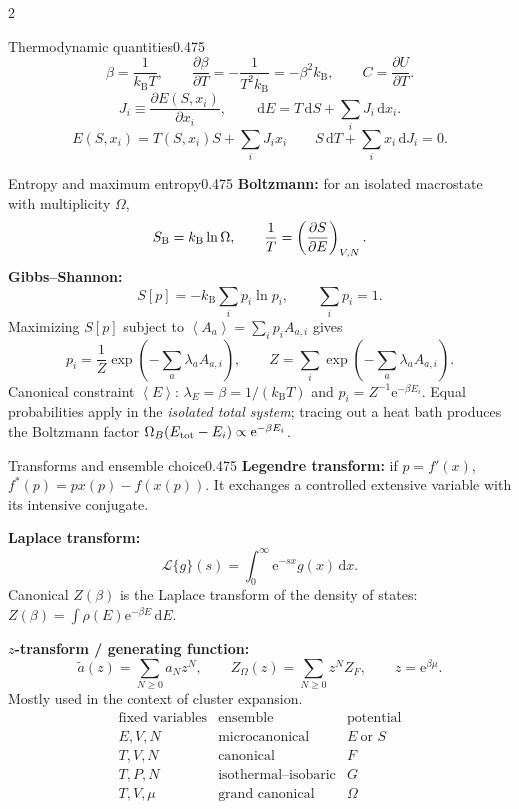 \documentclass[8pt,a4paper]{extarticle}
\newcommand{\dd}{\,\mathrm d}
\newcommand{\avg}[1]{\left\langle #1\right\rangle}
\newcommand{\e}{\mathrm e}
\newcommand{\kb}{k_{\mathrm B}}
\begin{document}
\begin{multicols*}{2}
\begin{mytikzbox}{Thermodynamic quantities}{0.475}
\[
\beta=\frac1{\kb T},\qquad
\frac{\partial\beta}{\partial T}=-\frac1{T^2\kb}=-\beta^2\kb,\qquad
C=\frac{\partial U}{\partial T}.
\]
\[
J_i\equiv\frac{\partial E(S,x_i)}{\partial x_i},\qquad
\dd E=T\dd S+\sum_i J_i\dd x_i.
\]
\[
E(S,x_i)=T(S,x_i)S+\sum_i J_i x_i
\qquad
S\dd T+\sum_i x_i\dd J_i=0.
\]
\end{mytikzbox}

\begin{mytikzbox}{Entropy and maximum entropy}{0.475}
\textbf{Boltzmann:} for an isolated macrostate with multiplicity $\Omega$,
\[
S_{\rm B}=\kb\ln\Omega,
\qquad \frac1T=\left(\frac{\partial S}{\partial E}\right)_{V,N}.
\]
\textbf{Gibbs--Shannon:}
\[
S[p]=-\kb\sum_i p_i\ln p_i,
\qquad \sum_i p_i=1.
\]
Maximizing $S[p]$ subject to $\avg{A_a}=\sum_i p_i A_{a,i}$ gives
\[
p_i=\frac1Z\exp\!\left(-\sum_a\lambda_a A_{a,i}\right),
\qquad Z=\sum_i\exp\!\left(-\sum_a\lambda_a A_{a,i}\right).
\]
Canonical constraint $\avg E$: $\lambda_E=\beta=1/(\kb T)$ and
$p_i=Z^{-1}\e^{-\beta E_i}$. Equal probabilities apply in the
\emph{isolated total system}; tracing out a heat bath produces the
Boltzmann factor $\Omega_B(E_{\rm tot}-E_i)\propto\e^{-\beta E_i}$.
\end{mytikzbox}

\begin{mytikzbox}{Transforms and ensemble choice}{0.475}
\textbf{Legendre transform:} if $p=f'(x)$,
$f^*(p)=px(p)-f(x(p))$.
It exchanges a controlled extensive variable with its intensive conjugate.

\textbf{Laplace transform:}
\[
\mathcal L\{g\}(s)=\int_0^\infty \e^{-sx}g(x)\dd x.
\]
Canonical $Z(\beta)$ is the Laplace transform of the density of states:
$Z(\beta)=\int\rho(E)\e^{-\beta E}\dd E$.

\textbf{$z$-transform / generating function:}
\[
\widetilde a(z)=\sum_{N\ge0}a_Nz^N,
\qquad Z_\Omega(z)=\sum_{N\ge0}z^N Z_F,
\qquad z=\e^{\beta\mu}.
\]
Mostly used in the context of cluster expansion.
\[
\begin{array}{c|c|c}
\text{fixed variables}&\text{ensemble}&\text{potential}\\ \hline
E,V,N&\text{microcanonical}&E\ \text{or }S\\
T,V,N&\text{canonical}&F\\
T,P,N&\text{isothermal--isobaric}&G\\
T,V,\mu&\text{grand canonical}&\Omega
\end{array}
\]
\end{mytikzbox}


\end{multicols*}
\end{document}
